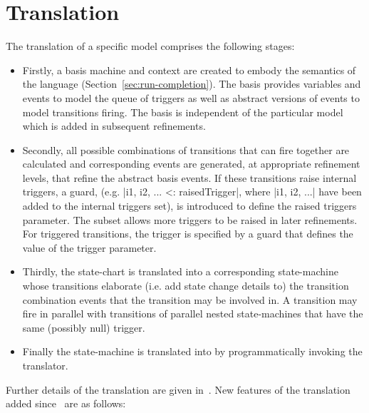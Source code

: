 
\section{\SCXML Translation}
\label{sec:translation}
The translation of a specific \SCXML model comprises the following stages: 
\begin{itemize}
	\item 
Firstly, a basis machine and context are created to embody the semantics of the \SCXML language (Section~\ref{sec:run-completion}).
The basis provides variables and events to model the queue of triggers as well as abstract versions of events to model transitions firing.
The basis is independent of the particular \SCXML model which is added in subsequent refinements.
	\item 
Secondly, all possible combinations of transitions that can fire together are calculated and corresponding events are generated, at appropriate refinement levels, that refine the abstract basis events.  
If these transitions raise internal triggers, a guard, (e.g. |{i1, i2, ...} <: raisedTrigger|, where |i1, i2, ...| have been added to the internal triggers set), is introduced to define the raised triggers parameter. 
The subset allows more triggers to be raised in later refinements.
For triggered transitions, the trigger is specified by a guard that defines the value of the trigger parameter. 
	\item 
Thirdly, the \SCXML state-chart is translated into a corresponding \UMLB state-machine whose transitions elaborate (i.e. add state change details to) the transition combination events that the transition may be involved in.
A transition may fire in parallel with transitions of parallel nested state-machines that have the same (possibly null) trigger.
	\item
Finally the \UMLB state-machine is translated into \EVENTB by programmatically invoking the \UMLB translator.
\end{itemize}
Further details of the translation are given in~\cite{MoSn16,MoSnHo18}.
New features of the translation added since~\cite{MoSnHo18} are as follows:
